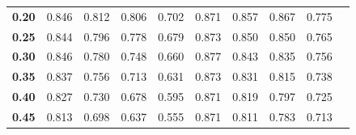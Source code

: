 \begin{table}[h]
\begin{small}
\begin{tabular}{|l|l|l|l|l|l|l|l|l|l|}
\cellcolor[HTML]{EFEFEF}\textbf{0.20}   &  \cellcolor[HTML]{FFEEEE}0.846               & \cellcolor[HTML]{FFEEEE}0.812              & \cellcolor[HTML]{FFEEEE}0.806                     & \cellcolor[HTML]{FFEEEE}0.702              &  \cellcolor[HTML]{EEFFEE}0.871               & \cellcolor[HTML]{EEFFEE}0.857              & \cellcolor[HTML]{EEFFEE}0.867                    & \cellcolor[HTML]{EEFFEE}0.775              \\ \cline{1-9}
\cellcolor[HTML]{EFEFEF}\textbf{0.25}   &  \cellcolor[HTML]{FFEEEE}0.844               & \cellcolor[HTML]{FFEEEE}0.796              & \cellcolor[HTML]{FFEEEE}0.778                     & \cellcolor[HTML]{FFEEEE}0.679              &  \cellcolor[HTML]{EEFFEE}0.873               & \cellcolor[HTML]{EEFFEE}0.850              & \cellcolor[HTML]{EEFFEE}0.850                    & \cellcolor[HTML]{EEFFEE}0.765              \\ \cline{1-9}
\cellcolor[HTML]{EFEFEF}\textbf{0.30}   &  \cellcolor[HTML]{FFEEEE}0.846               & \cellcolor[HTML]{FFEEEE}0.780              & \cellcolor[HTML]{FFEEEE}0.748                     & \cellcolor[HTML]{FFEEEE}0.660              &  \cellcolor[HTML]{EEFFEE}0.877               & \cellcolor[HTML]{EEFFEE}0.843              & \cellcolor[HTML]{EEFFEE}0.835                    & \cellcolor[HTML]{EEFFEE}0.756              \\ \cline{1-9}
\cellcolor[HTML]{EFEFEF}\textbf{0.35}   &  \cellcolor[HTML]{FFEEEE}0.837               & \cellcolor[HTML]{FFEEEE}0.756              & \cellcolor[HTML]{FFEEEE}0.713                     & \cellcolor[HTML]{FFEEEE}0.631              &  \cellcolor[HTML]{EEFFEE}0.873               & \cellcolor[HTML]{EEFFEE}0.831              & \cellcolor[HTML]{EEFFEE}0.815                    & \cellcolor[HTML]{EEFFEE}0.738              \\ \cline{1-9} 
\cellcolor[HTML]{EFEFEF}\textbf{0.40}   &  \cellcolor[HTML]{FFEEEE}0.827               & \cellcolor[HTML]{FFEEEE}0.730              & \cellcolor[HTML]{FFEEEE}0.678                     & \cellcolor[HTML]{FFEEEE}0.595              &  \cellcolor[HTML]{EEFFEE}0.871               & \cellcolor[HTML]{EEFFEE}0.819              & \cellcolor[HTML]{EEFFEE}0.797                    & \cellcolor[HTML]{EEFFEE}0.725              \\ \cline{1-9}
\cellcolor[HTML]{EFEFEF}\textbf{0.45}   &  \cellcolor[HTML]{FFEEEE}0.813               & \cellcolor[HTML]{FFEEEE}0.698              & \cellcolor[HTML]{FFEEEE}0.637                     & \cellcolor[HTML]{FFEEEE}0.555              &  \cellcolor[HTML]{EEFFEE}0.871               & \cellcolor[HTML]{EEFFEE}0.811              & \cellcolor[HTML]{EEFFEE}0.783                    & \cellcolor[HTML]{EEFFEE}0.713              \\ \cline{1-9}

\end{tabular}
\end{small}
\end{table}
